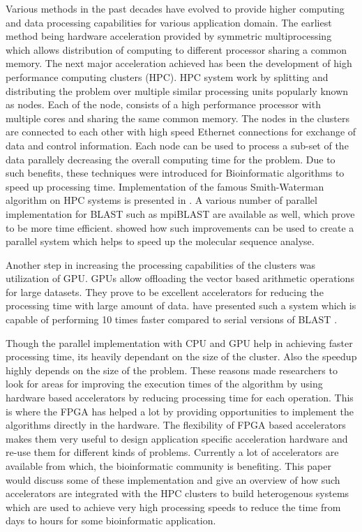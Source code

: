 \documentclass[12pt,twoside]{article}
\begin{document}
Various methods in the past decades have evolved to provide higher computing and data processing capabilities for various application domain.
The earliest method being hardware acceleration provided by symmetric multiprocessing which allows distribution of computing to different processor
sharing a common memory. The next major acceleration achieved has been the development of high performance computing clusters (HPC).  HPC
system work by splitting and distributing the problem over multiple similar processing units popularly known as nodes. Each of the node,
consists of a high performance processor with multiple cores and sharing the same common memory. The nodes in the clusters are connected to
each other with high speed Ethernet connections for exchange of data and control information. Each node can be used to
process a sub-set of the data parallely decreasing the overall computing time for the problem. Due to such benefits, these techniques were
introduced for Bioinformatic algorithms to speed up processing time.
Implementation of the famous Smith-Waterman algorithm on HPC systems is presented in \cite{boukerche_parallel_2005,martins_multithreaded_2000}.
A various number of parallel implementation for BLAST such as mpiBLAST \cite{darling_design_2003} are available as well, which prove
to be more time efficient. \textcite{schmidt_massively_2002} showed how such improvements can be used to create a parallel system which
helps to speed up the molecular sequence analyse.

Another step in increasing the processing capabilities of the clusters was utilization of GPU. GPUs allow offloading
the vector based arithmetic operations for large datasets. They prove to be excellent accelerators for reducing
the processing time with large amount of data. \textcite{liu_cuda-blastp:_2011} have presented such a system which is capable of performing
10 times faster compared to serial versions of BLAST \cite{altschul_basic_1990}.

Though the parallel implementation with CPU and GPU help in achieving faster processing time, its heavily dependant
on the size of the cluster. Also the speedup highly depends on the size of the problem. These reasons
made researchers to look for areas for improving the execution times of the algorithm by using hardware based
accelerators by reducing processing time for each operation. This is where the FPGA has 
helped a lot by providing opportunities to implement the algorithms directly in the hardware. The flexibility
of FPGA based accelerators makes them very useful to design application specific acceleration hardware and
re-use them for different kinds of problems. Currently a lot of accelerators are available from which, the bioinformatic
community is benefiting. This paper would discuss some of these implementation and give an overview of how
such accelerators are integrated with the HPC clusters to build heterogenous systems which are used to
achieve very high processing speeds to reduce the time from days to hours for some bioinformatic application.
\end{document}
